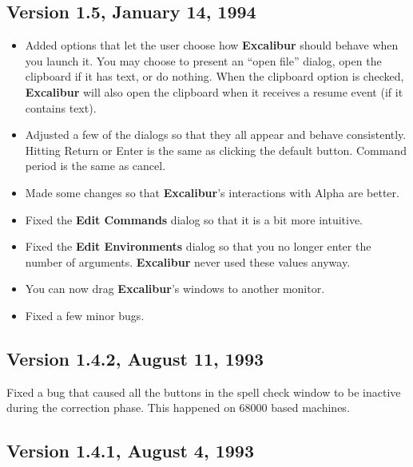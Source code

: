﻿\documentclass[11pt,titlepage]{article}
\newcommand{\ex}{\textbf{Excalibur}}
\begin{document}
\subsection{Version 1.5, January 14, 1994}

\begin{itemize}

\item Added options that let the user choose how \ex{} should behave
  when you launch it.  You may choose to present an ``open file''
  dialog, open the clipboard if it has text, or do nothing.  When the
  clipboard option is checked, \ex{} will also open the clipboard when
  it receives a resume event (if it contains text).

\item Adjusted a few of the dialogs so that they all appear and behave
  consistently.  Hitting Return or Enter is the same as clicking the
  default button.  Command period is the same as cancel.

\item Made some changes so that \ex's interactions with Alpha are
  better.

\item Fixed the \textbf{Edit Commands} dialog so that it is a bit more
  intuitive.

\item Fixed the \textbf{Edit Environments} dialog so that you no
  longer enter the number of arguments.  \ex{} never used these values
  anyway.

\item You can now drag \ex's windows to another monitor.

\item Fixed a few minor bugs.

\end{itemize}

\subsection{Version 1.4.2, August 11, 1993}

Fixed a bug that caused all the buttons in the spell check window to
be inactive during the correction phase.  This happened on 68000 based
machines.

\subsection{Version 1.4.1, August 4, 1993}
\end{document}
